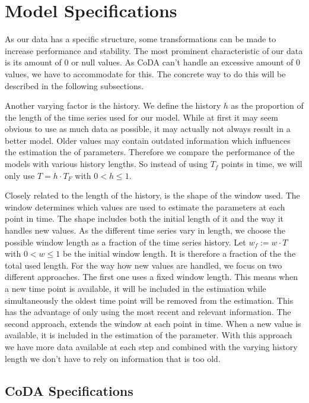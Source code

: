 \section{Model Specifications}
\label{sec: Model Specification}

As our data has a specific structure, some transformations can be made to increase performance and stability. The most prominent characteristic of our data is its amount of 0 or null values. As CoDA can't handle an excessive amount of 0 values, we have to accommodate for this. The concrete way to do this will be described in the following subsections. 

Another varying factor is the history. We define the history $h$ as the proportion of the length of the time series used for our model. While at first it may seem obvious to use as much data as possible, it may actually not always result in a better model. Older values may contain outdated information which influences the estimation the of parameters. Therefore we compare the performance of the models with various history lengths. So instead of using $T_f$ points in time, we will only use $T=h\cdot T_F$ with $0 < h \leq 1$. 

Closely related to the length of the history, is the shape of the window used. The window determines which values are used to estimate the parameters at each point in time. The shape includes both the initial length of it and the way it handles new values. As the different time series vary in length, we choose the possible window length as a fraction of the time series history. Let $w_f:=w \cdot T$ with $0 < w \leq 1$ be the initial window length. It is therefore a fraction of the the total used length. For the way how new values are handled, we focus on two different approaches. The first one uses a fixed window length. This means when a new time point is available, it will be included in the estimation while simultaneously the oldest time point will be removed from the estimation. This has the advantage of only using the most recent and relevant information. The second approach, extends the window at each point in time. When a new value is available, it is included in the estimation of the parameter. With this approach we have more data available at each step and combined with the varying history length we don't have to rely on information that is too old.

\subsection{CoDA Specifications}
\label{sec: Coda Specifications}

